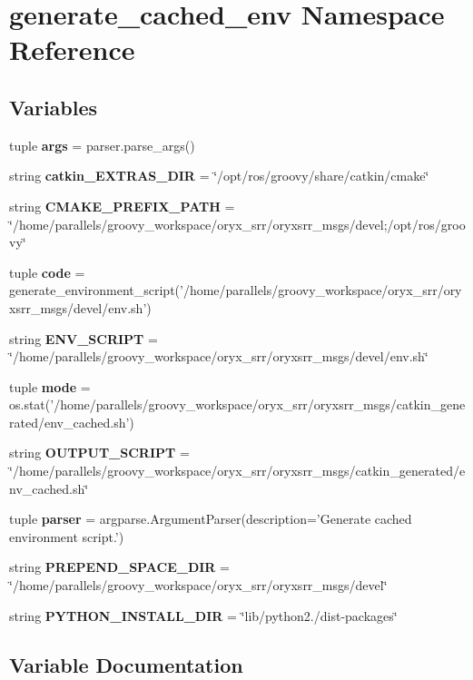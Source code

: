 \section{generate\-\_\-cached\-\_\-env \-Namespace \-Reference}
\label{namespacegenerate__cached__env}
\subsection*{\-Variables}
\begin{DoxyCompactItemize}
\item 
tuple {\bf args} = parser.\-parse\-\_\-args()
\item 
string {\bf catkin\-\_\-\-E\-X\-T\-R\-A\-S\-\_\-\-D\-I\-R} = \char`\"{}/opt/ros/groovy/share/catkin/cmake\char`\"{}
\item 
string {\bf \-C\-M\-A\-K\-E\-\_\-\-P\-R\-E\-F\-I\-X\-\_\-\-P\-A\-T\-H} = \char`\"{}/home/parallels/groovy\-\_\-workspace/oryx\-\_\-srr/oryxsrr\-\_\-msgs/devel;/opt/ros/groovy\char`\"{}
\item 
tuple {\bf code} = generate\-\_\-environment\-\_\-script('/home/parallels/groovy\-\_\-workspace/oryx\-\_\-srr/oryxsrr\-\_\-msgs/devel/env.\-sh')
\item 
string {\bf \-E\-N\-V\-\_\-\-S\-C\-R\-I\-P\-T} = \char`\"{}/home/parallels/groovy\-\_\-workspace/oryx\-\_\-srr/oryxsrr\-\_\-msgs/devel/env.\-sh\char`\"{}
\item 
tuple {\bf mode} = os.\-stat('/home/parallels/groovy\-\_\-workspace/oryx\-\_\-srr/oryxsrr\-\_\-msgs/catkin\-\_\-generated/env\-\_\-cached.\-sh')
\item 
string {\bf \-O\-U\-T\-P\-U\-T\-\_\-\-S\-C\-R\-I\-P\-T} = \char`\"{}/home/parallels/groovy\-\_\-workspace/oryx\-\_\-srr/oryxsrr\-\_\-msgs/catkin\-\_\-generated/env\-\_\-cached.\-sh\char`\"{}
\item 
tuple {\bf parser} = argparse.\-Argument\-Parser(description='\-Generate cached environment script.')
\item 
string {\bf \-P\-R\-E\-P\-E\-N\-D\-\_\-\-S\-P\-A\-C\-E\-\_\-\-D\-I\-R} = \char`\"{}/home/parallels/groovy\-\_\-workspace/oryx\-\_\-srr/oryxsrr\-\_\-msgs/devel\char`\"{}
\item 
string {\bf \-P\-Y\-T\-H\-O\-N\-\_\-\-I\-N\-S\-T\-A\-L\-L\-\_\-\-D\-I\-R} = \char`\"{}lib/python2./dist-\/packages\char`\"{}
\end{DoxyCompactItemize}


\subsection{\-Variable \-Documentation}
